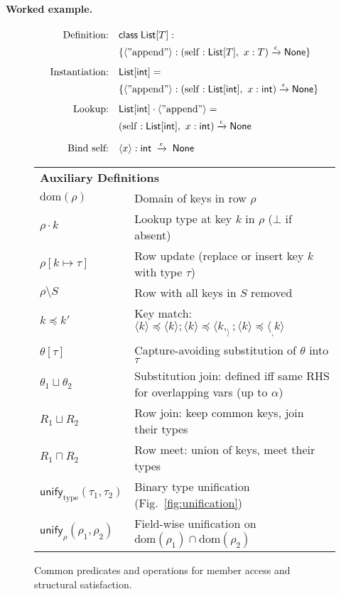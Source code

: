\paragraph{Worked example.}
\[
\begin{aligned}
\text{Definition:} \quad & \mathsf{class}\; \mathsf{List}[T] :
\\ & \{\langle \mathrm{"append"} \rangle : (\mathrm{self}:\mathsf{List}[T],\ x:T) \xrightarrow{\epsilon} \mathsf{None} \} \\[0.5em]
\text{Instantiation:} \quad & \mathsf{List}[\mathsf{int}] =
\\ & \{\langle \mathrm{"append"} \rangle : (\mathrm{self}:\mathsf{List}[\mathsf{int}],\ x:\mathsf{int}) \xrightarrow{\epsilon} \mathsf{None} \} \\[0.5em]
\text{Lookup:} \quad & \mathsf{List}[\mathsf{int}] \cdot \langle \mathrm{"append"} \rangle =
\\ & (\mathrm{self}:\mathsf{List}[\mathsf{int}],\ x:\mathsf{int}) \xrightarrow{\epsilon} \mathsf{None} \\[0.5em]
\text{Bind self:} \quad & \langle x\rangle:\mathsf{int} \;\xrightarrow{\epsilon}\; \mathsf{None}
\end{aligned}
\]

\begin{figure}[t]
\centering
\renewcommand{\arraystretch}{1.2}
\begin{tabular}{l l}
\multicolumn{2}{l}{\textbf{Auxiliary Definitions}} \\[0.3em]
$\mathrm{dom}(\rho)$ & Domain of keys in row $\rho$ \\
$\rho \cdot k$ & Lookup type at key $k$ in $\rho$ ($\bot$ if absent) \\
$\rho[k \mapsto \tau]$ & Row update (replace or insert key $k$ with type $\tau$) \\
$\rho \setminus S$ & Row with all keys in $S$ removed \\
$k \preccurlyeq k'$ & Key match: $\langle k \rangle \preccurlyeq \langle k \rangle; \langle k \rangle \preccurlyeq \langle k, _ \rangle; \langle k \rangle \preccurlyeq \langle _, k \rangle$ \\
$\theta[\tau]$ & Capture-avoiding substitution of $\theta$ into $\tau$ \\
$\theta_1 \sqcup \theta_2$ & Substitution join: defined iff same RHS for overlapping vars (up to $\alpha$) \\
$R_1 \sqcup R_2$ & Row join: keep common keys, join their types \\
$R_1 \sqcap R_2$ & Row meet: union of keys, meet their types \\
$\mathsf{unify}_{\mathrm{type}}(\tau_1,\tau_2)$ & Binary type unification (Fig.~\ref{fig:unification}) \\
$\mathsf{unify}_{\rho}(\rho_1,\rho_2)$ & Field-wise unification on $\mathrm{dom}(\rho_1) \cap \mathrm{dom}(\rho_2)$
\end{tabular}
\caption{Common predicates and operations for member access and structural satisfaction.}
\label{fig:auxiliary-defs}
\end{figure}

